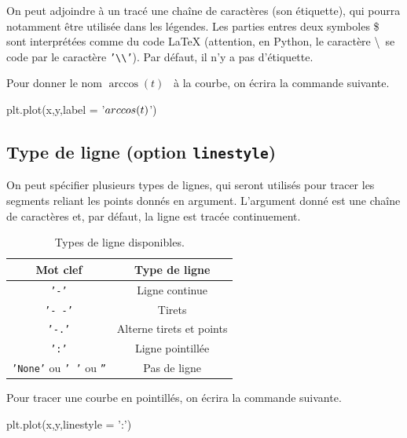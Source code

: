 On peut adjoindre à un tracé une chaîne de caractères (son étiquette), qui pourra notamment être utilisée dans les légendes. 
Les parties entres deux symboles \$ sont interprétées comme du code LaTeX  (attention, en Python, le caractère \textbackslash\ se code par le caractère \texttt{'\textbackslash\textbackslash'}). 
Par défaut, il n'y a pas d'étiquette.
\begin{exemple}
  Pour donner le nom \og $\arccos(t)$ \fg\ à la courbe, on écrira la commande suivante.
\begin{pyverbatim}
plt.plot(x,y,label = '$\\arccos(t)$')
\end{pyverbatim}
\end{exemple}
\subsection{Type de ligne (option \texttt{linestyle})}

On peut spécifier plusieurs types de lignes, qui seront utilisés pour tracer les segments reliant les points donnés en argument. 
L'argument donné est une chaîne de caractères et, par défaut, la ligne est tracée continuement. 

\begin{table}[!h]
  \begin{center}
    \begin{tabular}{|c|c|}
      \hline
      Mot clef & Type de ligne \\
      \hline
      \texttt{'-'} & Ligne continue \\
      \hline
      \texttt{'-  -'} & Tirets  \\
      \hline
      \texttt{'-.'} & Alterne tirets et points \\
      \hline
      \texttt{':'} & Ligne pointillée \\
      \hline
      \texttt{'None'} ou \texttt{' '} ou \texttt{''} & Pas de ligne \\
      \hline
    \end{tabular}
    \caption{Types de ligne disponibles.}
  \end{center}
\end{table}

\begin{exemple}
  Pour tracer une courbe en pointillés, on écrira la commande suivante.
\begin{pyverbatim}
plt.plot(x,y,linestyle = ':')
\end{pyverbatim}
\end{exemple}

